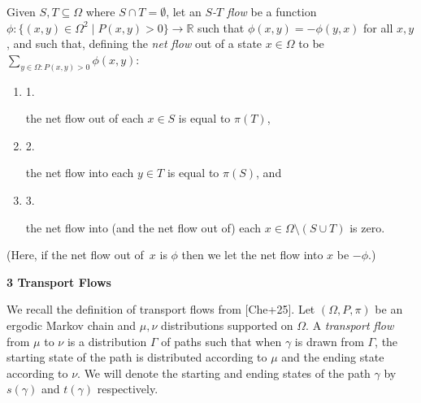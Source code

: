 Given $S,T\subseteq\Omega$ where $S\cap T=\emptyset$, let an \emph{$S$-$T$ flow} be a function $\phi:\{(x,y)\in\Omega^{2}\mid P(x,y)>0\}\rightarrow\mathbb{R}$ such that $\phi(x,y)=-\phi(y,x)$ for all $x,y$, and such that, defining the \emph{net flow} out of a state $x\in\Omega$ to be $\sum_{y\in\Omega:P(x,y)>0}\phi(x,y)$:\par


\begin{enumerate}


\item[] 1. 


the net flow out of each $x\in S$ is equal to $\pi(T)$\thinspace{},\par




\item[] 2. 


the net flow into each $y\in T$ is equal to $\pi(S)$\thinspace{}, and\par




\item[] 3. 


the net flow into (and the net flow out of) each $x\in\Omega\setminus\left(S\cup T\right)$ is zero.\par




\end{enumerate}


(Here, if the net flow out of $x$ is $\phi$ then we let the net flow into $x$ be $-\phi$.)\par






\par\medskip\noindent\textbf{3 Transport Flows}\par




We recall the definition of transport flows from [Che+25]. Let $(\Omega,P,\pi)$ be an ergodic Markov chain and $\mu,\nu$ distributions supported on $\Omega$. A \emph{transport flow} from $\mu$ to $\nu$ is a distribution $\Gamma$ of paths such that when $\gamma$ is drawn from $\Gamma$, the starting state of the path is distributed according to $\mu$ and the ending state according to $\nu$. We will denote the starting and ending states of the path $\gamma$ by $s(\gamma)$ and $t(\gamma)$ respectively.\par




